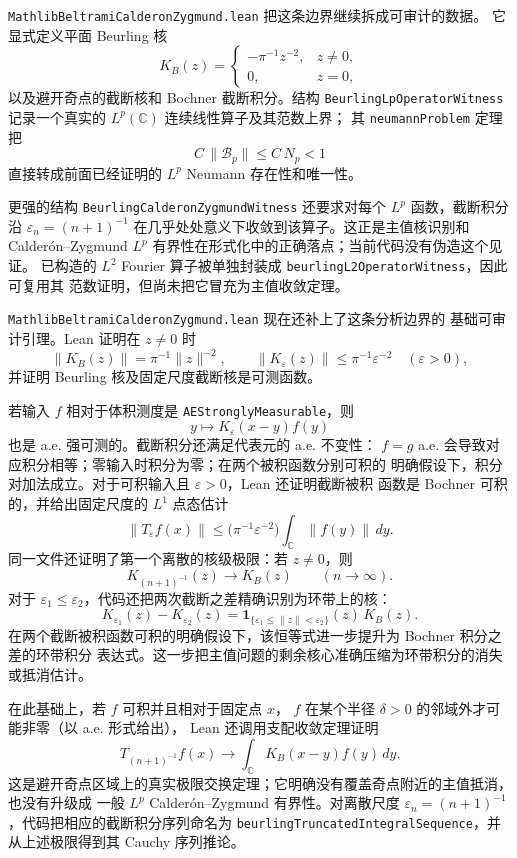 \documentclass[UTF8,fontset=none,a4paper,11pt]{ctexart}
\begin{document}
\texttt{MathlibBeltramiCalderonZygmund}\allowbreak\texttt{.lean} 把这条边界继续拆成可审计的数据。
它显式定义平面 Beurling 核
\[
 K_B(z)=
 \begin{cases}
 -\pi^{-1}z^{-2},&z\ne0,\\
 0,&z=0,
 \end{cases}
\]
以及避开奇点的截断核和 Bochner 截断积分。结构
\texttt{BeurlingLpOperatorWitness} 记录一个真实的 \(L^p(\mathbb C)\) 连续线性算子及其范数上界；
其 \texttt{neumannProblem} 定理把
\[
 C\,\lVert\mathcal B_p\rVert\leq C\,N_p<1
\]
直接转成前面已经证明的 \(L^p\) Neumann 存在性和唯一性。
\par
更强的结构 \texttt{BeurlingCalderonZygmundWitness} 还要求对每个 \(L^p\) 函数，截断积分沿
\(\varepsilon_n=(n+1)^{-1}\) 在几乎处处意义下收敛到该算子。这正是主值核识别和
Calderón--Zygmund \(L^p\) 有界性在形式化中的正确落点；当前代码没有伪造这个见证。
已构造的 \(L^2\) Fourier 算子被单独封装成 \texttt{beurlingL2OperatorWitness}，因此可复用其
范数证明，但尚未把它冒充为主值收敛定理。

\texttt{MathlibBeltramiCalderonZygmund}\allowbreak\texttt{.lean} 现在还补上了这条分析边界的
基础可审计引理。Lean 证明在 \(z\ne0\) 时
\[
 \lVert K_B(z)\rVert=\pi^{-1}\lVert z\rVert^{-2},
 \qquad
 \lVert K_\varepsilon(z)\rVert\leq\pi^{-1}\varepsilon^{-2}\quad(\varepsilon>0),
\]
并证明 Beurling 核及固定尺度截断核是可测函数。\par
若输入 \(f\) 相对于体积测度是
\texttt{AEStrongly}\allowbreak\texttt{Measurable}，则
\[
 y\longmapsto K_\varepsilon(x-y)f(y)
\]
也是 a.e. 强可测的。截断积分还满足代表元的 a.e. 不变性：
\(f=g\) a.e. 会导致对应积分相等；零输入时积分为零；在两个被积函数分别可积的
明确假设下，积分对加法成立。对于可积输入且 \(\varepsilon>0\)，Lean 还证明截断被积
函数是 Bochner 可积的，并给出固定尺度的 \(L^1\) 点态估计
\[
 \lVert T_\varepsilon f(x)\rVert
 \leq \bigl(\pi^{-1}\varepsilon^{-2}\bigr)
       \int_{\mathbb C}\lVert f(y)\rVert\,dy.
\]
同一文件还证明了第一个离散的核级极限：若 \(z\ne0\)，则
\[
 K_{(n+1)^{-1}}(z)\longrightarrow K_B(z)\qquad(n\to\infty).
\]
对于 \(\varepsilon_1\leq\varepsilon_2\)，代码还把两次截断之差精确识别为环带上的核：
\[
 K_{\varepsilon_1}(z)-K_{\varepsilon_2}(z)
 =
 \mathbf 1_{\{\varepsilon_1\leq\lVert z\rVert<\varepsilon_2\}}(z)\,K_B(z).
\]
在两个截断被积函数可积的明确假设下，该恒等式进一步提升为 Bochner 积分之差的环带积分
表达式。这一步把主值问题的剩余核心准确压缩为环带积分的消失或抵消估计。\par
在此基础上，若 \(f\) 可积并且相对于固定点 \(x\)，
\(f\) 在某个半径 \(\delta>0\) 的邻域外才可能非零（以 a.e. 形式给出），
Lean 还调用支配收敛定理证明
\[
 T_{(n+1)^{-1}}f(x)\longrightarrow
 \int_{\mathbb C}K_B(x-y)f(y)\,dy.
\]
这是避开奇点区域上的真实极限交换定理；它明确没有覆盖奇点附近的主值抵消，也没有升级成
一般 \(L^p\) Calderón--Zygmund 有界性。对离散尺度
\(\varepsilon_n=(n+1)^{-1}\)，代码把相应的截断积分序列命名为
\texttt{beurlingTruncatedIntegralSequence}，并从上述极限得到其 Cauchy 序列推论。\par
\end{document}
